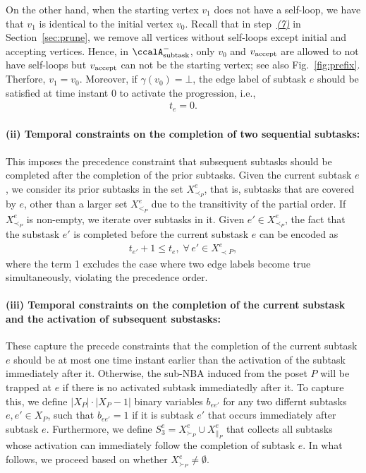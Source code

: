 \documentclass[Afour,sageh,times]{sagej}
\newcounter{mycounter}
\newcommand{\auto}[1]{\ccalA_{\textup{#1}}}
\newcommand{\vertex}[1]{v_{\textup{#1}}}
\begin{document}
{{{  On the other hand, when the starting vertex $v_1$ does not have a self-loop, we have that $v_1$ is identical to the initial vertex $v_0$. Recall that in step~\hyperref[prune:infeasible]{\it (7)} in Section~\ref{sec:prune}, we remove all vertices without self-loops except initial and accepting vertices. Hence, in $\auto{subtask}^-$, only $v_0$ and $\vertex{accept}$ are allowed to not have self-loops but $\vertex{accept}$ can not be the starting vertex; see also Fig.~\ref{fig:prefix}. Therfore, $v_1 = v_0$. Moreover, if $\gamma(v_0) = \bot$, the edge label of subtask $e$ should be satisfied at time instant 0 to activate the progression, i.e.,
  \begingroup\makeatletter\def\f@size{10}\check@mathfonts
\def\maketag@@@#1{\hbox{\m@th\normalsize\normalfont#1}}%
  \begin{align}
 t_e = 0. \label{eq:tis0}
  \end{align}
  \endgroup


\paragraph{(ii) Temporal constraints on the completion of two sequential subtasks:}\label{sec:constraintonedge}
This imposes the precedence constraint that subsequent subtasks should be completed after the completion of the prior subtasks.   Given the current subtask $e$, we consider its prior subtasks in the set $X^e_{\prec_{P}}$, that is, subtasks that are covered by $e$, other than a larger set $X^e_{<_{P}}$ due to the transitivity of the partial order.
If $X^e_{\prec_{P}}$ is non-empty, we iterate over subtasks in it.  Given $e' \in X^e_{\prec_{P}}$, the fact that the substask $e'$ is completed before the current substask $e$ can be encoded as
\begingroup\makeatletter\def\f@size{10}\check@mathfonts
\def\maketag@@@#1{\hbox{\m@th\normalsize\normalfont#1}}%
\begin{align}\label{eq:12}
  t_{e'} +  1  \leq t_e, \; \forall \, e' \in X_{\prec P}^e,
\end{align}
\endgroup
where the term 1 excludes the case where two edge labels become true simultaneously, violating the precedence order.

\paragraph{(iii)  Temporal constraints on  the  completion of the current substask and the activation  of subsequent substasks:}
These capture the precede constraints that the completion of the current subtask $e$ should be at most one time instant earlier than the activation of the subtask immediately after it. Otherwise, the sub-NBA induced from the poset $P$ will be trapped at $e$ if there is no activated subtask immediatedly after it. To capture this, we define $|X_P|\cdot |X_P -1|$ binary variables $b_{ee'}$ for any two differnt subtasks  $e, e' \in X_P$,  such that $b_{ee'}=1$  if it is subtask $e'$ that occurs immediately after subtask $e$. Furthermore, we define  $S_3^e = X^e_{\succ_{P}} \cup X^e_{\|_{P}}$ that collects all subtasks whose activation can immediately follow the completion of subtask $e$.  In what follows, we proceed based on whether $ X^e_{\succ_{P}} \neq \emptyset$.
}}}
\end{document}
